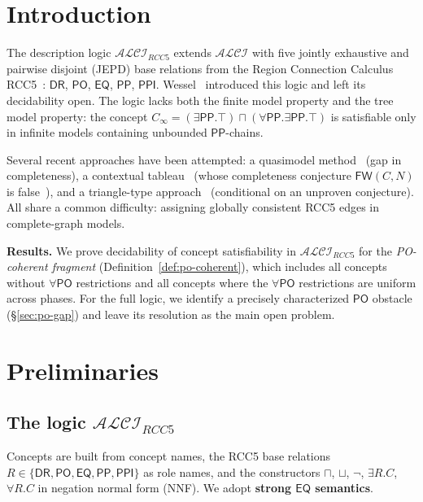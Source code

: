 \documentclass[a4paper,11pt]{article}
\theoremstyle{definition}
\newcommand{\ALCI}{\ensuremath{\mathcal{ALCI}}}
\newcommand{\ALCIRCC}[1]{\ensuremath{\mathcal{ALCI}_{\mathit{RCC#1}}}}
\newcommand{\DR}{\ensuremath{\mathsf{DR}}}
\newcommand{\PO}{\ensuremath{\mathsf{PO}}}
\newcommand{\EQ}{\ensuremath{\mathsf{EQ}}}
\newcommand{\PP}{\ensuremath{\mathsf{PP}}}
\newcommand{\PPI}{\ensuremath{\mathsf{PPI}}}
\begin{document}
\section{Introduction}\label{sec:intro}

The description logic $\ALCIRCC{5}$ extends $\ALCI$ with five jointly
exhaustive and pairwise disjoint (JEPD) base relations from the
Region Connection Calculus RCC5~\cite{RandellCuiCohn1992}: $\DR$,
$\PO$, $\EQ$, $\PP$, $\PPI$.  Wessel~\cite{Wessel2003} introduced
this logic and left its decidability open.  The logic lacks both the
finite model property and the tree model property: the concept
$C_\infty = (\exists\PP.\top) \sqcap (\forall\PP.\exists\PP.\top)$ is
satisfiable only in infinite models containing unbounded $\PP$-chains.

Several recent approaches have been attempted:
a quasimodel method~\cite{Claude2026} (gap in completeness),
a contextual tableau~\cite{GPT2026} (whose completeness conjecture
$\mathsf{FW}(C,N)$ is false~\cite{ClaudeFW2026}), and a
triangle-type approach~\cite{ClaudeTriangle2026} (conditional on an
unproven conjecture).  All share a common difficulty: assigning
globally consistent RCC5 edges in complete-graph models.

\textbf{Results.}\; We prove decidability of concept satisfiability
in $\ALCIRCC{5}$ for the \emph{PO-coherent fragment}
(Definition~\ref{def:po-coherent}), which includes all concepts
without $\forall\PO$ restrictions and all concepts where the
$\forall\PO$ restrictions are uniform across phases.  For the full
logic, we identify a precisely characterized $\PO$ obstacle
(\S\ref{sec:po-gap}) and leave its resolution as the main open
problem.


\section{Preliminaries}\label{sec:prelim}

\subsection{The logic $\ALCIRCC{5}$}

Concepts are built from concept names, the RCC5 base relations
$R \in \{\DR, \PO, \EQ, \PP, \PPI\}$ as role names, and the
constructors $\sqcap$, $\sqcup$, $\neg$, $\exists R.C$,
$\forall R.C$ in negation normal form (NNF).  We adopt
\textbf{strong $\EQ$ semantics}.
\end{document}
